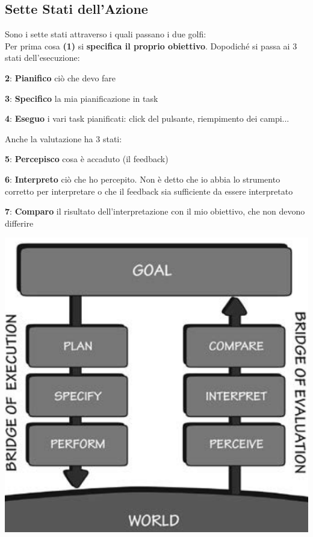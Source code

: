 \documentclass[10pt]{article}
\begin{document}
\subsection{Sette Stati dell'Azione}
\begin{multicols}{2}
Sono i sette stati attraverso i quali passano i due golfi:\\
Per prima cosa \textbf{(1)} si \textbf{specifica il proprio obiettivo}. Dopodiché si passa ai 3 stati dell'esecuzione:
\begin{list}{}{}
\item \textbf{2}: \textbf{Pianifico} ciò che devo fare
\item \textbf{3}: \textbf{Specifico} la mia pianificazione in task
\item \textbf{4}: \textbf{Eseguo} i vari task pianificati: click del pulsante, riempimento dei campi...
\end{list}
Anche la valutazione ha 3 stati:
\begin{list}{}{}
\item \textbf{5}: \textbf{Percepisco} cosa è accaduto (il feedback)
\item \textbf{6}: \textbf{Interpreto} ciò che ho percepito. Non è detto che io abbia lo strumento corretto per interpretare o che il feedback sia sufficiente da essere interpretato
\item \textbf{7}: \textbf{Comparo} il risultato dell'interpretazione con il mio obiettivo, che non devono differire
\end{list}
\columnbreak


\includegraphics[scale=0.45]{settestatiazione.png}
\end{multicols}
\end{document}
